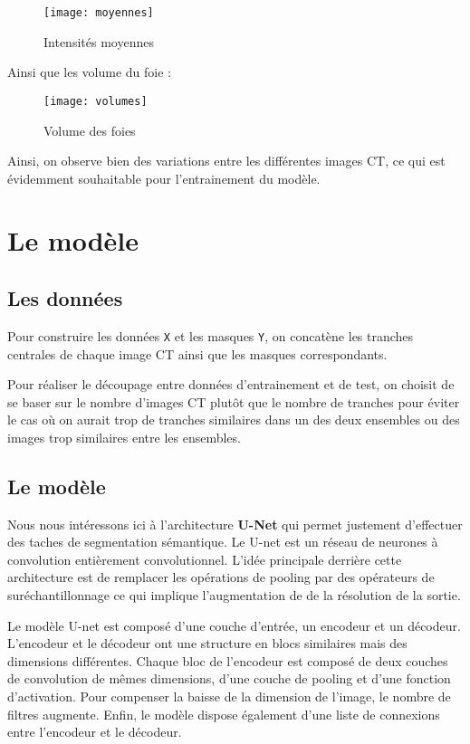 \documentclass[12pt,a4paper,titlepage]{scrartcl}
\begin{document}
\begin{figure}[H]
    \caption{Intensités moyennes}
    \texttt{[image: moyennes]}
    \centering
\end{figure}

Ainsi que les volume du foie :

\begin{figure}[H]
    \caption{Volume des foies}
    \texttt{[image: volumes]}
    \centering
\end{figure}

Ainsi, on observe bien des variations entre les différentes images CT, ce
qui est évidemment souhaitable pour l'entrainement du modèle.

\section{Le modèle}

\subsection{Les données}

Pour construire les données \texttt{X} et les masques \texttt{Y}, on concatène les
tranches centrales de chaque image CT ainsi que les masques correspondants.

Pour réaliser le découpage entre données d'entrainement et de test,
on choisit de se baser sur le nombre d'images CT plutôt que le nombre
de tranches pour éviter le cas où on aurait trop de tranches similaires
dans un des deux ensembles ou des images trop similaires entre les
ensembles.

\subsection{Le modèle}

Nous nous intéressons ici à l'architecture \textbf{U-Net} qui permet justement d'effectuer
des taches de segmentation sémantique. Le U-net est un réseau de neurones à convolution entièrement
convolutionnel. L'idée principale derrière cette architecture est de remplacer les opérations
de pooling par des opérateurs de suréchantillonnage ce qui implique l'augmentation de de la
résolution de la sortie.

Le modèle U-net est composé d'une couche d'entrée, un encodeur et un décodeur.
L'encodeur et le décodeur ont une structure en blocs similaires mais des dimensions différentes.
Chaque bloc de l'encodeur est composé de deux couches de convolution de mêmes dimensions,
d'une couche de pooling et d'une fonction d'activation. Pour compenser la baisse de la
dimension de l'image, le nombre de filtres augmente. Enfin, le modèle dispose également d'une
liste de connexions entre l'encodeur et le décodeur.
\end{document}
